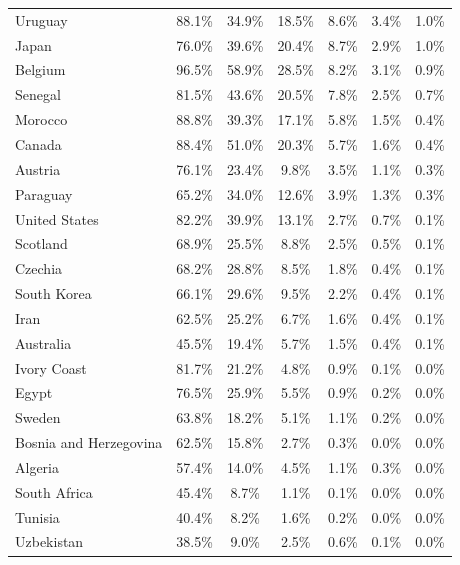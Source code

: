 \documentclass[11pt,letterpaper]{article}
\begin{document}
\begin{table}[p]
\begin{tabular}{lcccccc}
Uruguay                & 88.1\% & 34.9\% & 18.5\% &  8.6\% &  3.4\% &  1.0\% \\
Japan                  & 76.0\% & 39.6\% & 20.4\% &  8.7\% &  2.9\% &  1.0\% \\
Belgium                & 96.5\% & 58.9\% & 28.5\% &  8.2\% &  3.1\% &  0.9\% \\
Senegal                & 81.5\% & 43.6\% & 20.5\% &  7.8\% &  2.5\% &  0.7\% \\
Morocco                & 88.8\% & 39.3\% & 17.1\% &  5.8\% &  1.5\% &  0.4\% \\
Canada                 & 88.4\% & 51.0\% & 20.3\% &  5.7\% &  1.6\% &  0.4\% \\
Austria                & 76.1\% & 23.4\% &  9.8\% &  3.5\% &  1.1\% &  0.3\% \\
Paraguay               & 65.2\% & 34.0\% & 12.6\% &  3.9\% &  1.3\% &  0.3\% \\
United States          & 82.2\% & 39.9\% & 13.1\% &  2.7\% &  0.7\% &  0.1\% \\
Scotland               & 68.9\% & 25.5\% &  8.8\% &  2.5\% &  0.5\% &  0.1\% \\
Czechia                & 68.2\% & 28.8\% &  8.5\% &  1.8\% &  0.4\% &  0.1\% \\
South Korea            & 66.1\% & 29.6\% &  9.5\% &  2.2\% &  0.4\% &  0.1\% \\
Iran                   & 62.5\% & 25.2\% &  6.7\% &  1.6\% &  0.4\% &  0.1\% \\
Australia              & 45.5\% & 19.4\% &  5.7\% &  1.5\% &  0.4\% &  0.1\% \\
Ivory Coast            & 81.7\% & 21.2\% &  4.8\% &  0.9\% &  0.1\% &  0.0\% \\
Egypt                  & 76.5\% & 25.9\% &  5.5\% &  0.9\% &  0.2\% &  0.0\% \\
Sweden                 & 63.8\% & 18.2\% &  5.1\% &  1.1\% &  0.2\% &  0.0\% \\
Bosnia and Herzegovina & 62.5\% & 15.8\% &  2.7\% &  0.3\% &  0.0\% &  0.0\% \\
Algeria                & 57.4\% & 14.0\% &  4.5\% &  1.1\% &  0.3\% &  0.0\% \\
South Africa           & 45.4\% &  8.7\% &  1.1\% &  0.1\% &  0.0\% &  0.0\% \\
Tunisia                & 40.4\% &  8.2\% &  1.6\% &  0.2\% &  0.0\% &  0.0\% \\
Uzbekistan             & 38.5\% &  9.0\% &  2.5\% &  0.6\% &  0.1\% &  0.0\% \\

\end{tabular}
\end{table}
\end{document}

